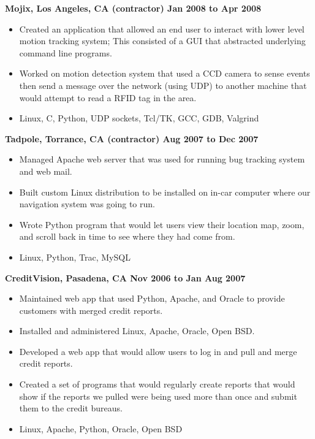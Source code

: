 \documentclass{res}
\begin{document}
\begin{resume}
{\large \bf Mojix, Los Angeles, CA (contractor) \hfill Jan 2008 to Apr 2008}
\begin{itemize}

\item Created an application that allowed an end user to interact
with lower level motion tracking system; This consisted of a GUI
that abstracted underlying command line programs.

\item Worked on motion detection system that used a CCD camera to sense
events then send a message over the network (using UDP) to another
machine that would attempt to read a RFID tag in the area.

\item Linux, C, Python, UDP sockets, Tcl/TK, GCC, GDB, Valgrind
\end{itemize}

{\large \bf Tadpole, Torrance, CA (contractor) \hfill Aug 2007 to Dec 2007}
\begin{itemize}

\item Managed Apache web server that was used for running bug
tracking system and web mail.

\item Built custom Linux distribution to be installed on in-car
computer where our navigation system was going to run.

\item Wrote Python program that would let users view their location
map, zoom, and scroll back in time to see where they had come from.

\item Linux, Python, Trac, MySQL

\end{itemize}

{\large \bf CreditVision, Pasadena, CA \hfill Nov 2006 to Jan Aug 2007}
\begin{itemize}
\item Maintained web app that used Python, Apache, and Oracle to
provide customers with merged credit reports.
\item Installed and administered Linux, Apache, Oracle, Open BSD.
\item Developed a web app that would allow users to log in and
pull and merge credit reports.
\item Created a set of programs that would regularly create reports
that would show if the reports we pulled were being used more than
once and submit them to the credit bureaus.
\item  Linux, Apache, Python, Oracle, Open BSD
\end{itemize}


\end{resume}
\end{document}
